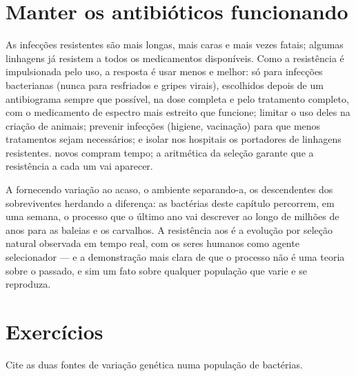 \section{Manter os antibióticos funcionando}

\begin{proposition}\label{prop:g11:antibiotic-resistance:consequences}
As infecções resistentes são mais longas, mais caras e mais vezes
fatais; algumas linhagens já resistem a todos os medicamentos
disponíveis. Como a resistência é impulsionada pelo uso, a resposta é
usar  menos e melhor: só para infecções bacterianas (nunca
para resfriados e gripes virais), escolhidos depois de um antibiograma
sempre que possível, na dose completa e pelo tratamento completo, com o
medicamento de espectro mais estreito que funcione; limitar o uso deles
na criação de animais; prevenir infecções (higiene, vacinação) para que
menos tratamentos sejam necessários; e isolar nos hospitais os
portadores de linhagens resistentes.  novos compram tempo;
a aritmética da seleção garante que a resistência a cada um vai
aparecer.
\end{proposition}
\admitted

\begin{remark}\label{rem:g11:antibiotic-resistance:evolution}
A  fornecendo variação ao acaso, o ambiente separando-a, os
descendentes dos sobreviventes herdando a diferença: as bactérias deste
capítulo percorrem, em uma semana, o processo que o último ano vai
descrever ao longo de milhões de anos para as baleias e os carvalhos. A
resistência aos  é a evolução por seleção natural observada
em tempo real, com os seres humanos como agente selecionador --- e a
demonstração mais clara de que o processo não é uma teoria sobre o
passado, e sim um fato sobre qualquer população que varie e se
reproduza.
\end{remark}

\section{Exercícios}

\begin{exercise}[$\star$]\label{exo:g11:antibiotic-resistance:1}
Cite as duas fontes de variação genética numa população de bactérias.
\end{exercise}

